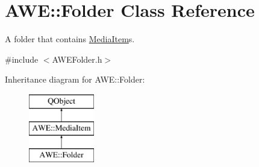 \hypertarget{class_a_w_e_1_1_folder}{\section{A\-W\-E\-:\-:Folder Class Reference}
\label{class_a_w_e_1_1_folder}
}


A folder that contains {\ttfamily \hyperlink{class_a_w_e_1_1_media_item}{Media\-Item}}s.  




{\ttfamily \#include $<$A\-W\-E\-Folder.\-h$>$}

Inheritance diagram for A\-W\-E\-:\-:Folder\-:\begin{figure}[H]
\begin{center}
\leavevmode
\includegraphics[height=3.000000cm]{class_a_w_e_1_1_folder}
\end{center}
\end{figure}
